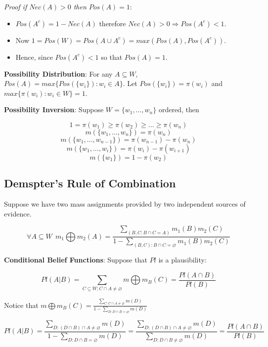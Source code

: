 \documentclass{article}
\begin{document}
\textit{Proof if $Nec(A) > 0$ then $Pos(A) = 1$}: 

\begin{itemize}
    \item $Pos(A^c) = 1 - Nec(A)$ therefore $Nec(A) > 0 \Rightarrow Pos(A^c) < 1$. 
    \item Now $1 = Pos(W) = Pos(A \cup A^c) = max(Pos(A), Pos(A^c))$.
    \item Hence, since $Pos(A^c) < 1$ so that $Pos(A) = 1$.
\end{itemize}

\textbf{Possibility Distribution}: For any $A \subseteq W$, $Pos(A) = max\{ Pos(\{w_i\}): w_i \in A \}$. Let $Pos(\{w_i\}) = \pi(w_i)$ and $max \{ \pi(w_i): w_i \in W \} = 1$.

\textbf{Possibility Inversion}: Suppose $W = \{ w_1, \dots, w_n\}$ ordered, then

$$1 = \pi(w_1) \geq \pi(w_2) \geq \dots \geq \pi(w_n)$$
$$m(\{w_1, \dots, w_n \}) = \pi(w_n)$$
$$m(\{w_1, \dots, w_{n-1} \}) = \pi(w_{n-1}) - \pi(w_n)$$
$$m(\{w_1, \dots, w_i \}) = \pi(w_i) - \pi(w_{i+1}) $$
$$m(\{w_1\}) = 1 - \pi(w_2)$$


\subsection{Demspter’s Rule of Combination}

Suppose we have two mass assignments provided by two independent sources of evidence.

\begin{equation}
    \forall A \subseteq W\ \ m_1 \bigoplus m_2 (A) = \frac{\sum_{(B, C: B \cap C = A)} m_1(B)m_2(C)}{1 - \sum_{(B, C): B \cap C = \varnothing}m_1(B)m_2(C)}
\end{equation}

\textbf{Conditional Belief Functions}: Suppose that $Pl$ is a plausibility:

\begin{equation}
    Pl(A | B) = \sum_{C \subseteq W; C \cap A \neq \varnothing} m \bigoplus m_B(C) = \frac{Pl(A \cap B)}{Pl(B)}
\end{equation}

Notice that $m \bigoplus m_B(C) = \frac{\sum_{C: C \cap A \neq \varnothing}m(D)}{1-\sum_{D:D\cap B = \varnothing}m(D)}$

$$Pl(A | B) = \frac{\sum_{D:(D \cap B) \cap A \neq \varnothing} m(D)}{1 - \sum_{D: D \cap B = \varnothing}m(D)}=\frac{\sum_{D:(D\cap B)\cap A \neq \varnothing}m(D)}{\sum_{D:D\cap B \neq \varnothing}m(D)} = \frac{Pl(A\cap B)}{Pl(B)}$$
\end{document}
